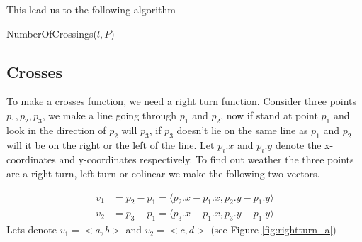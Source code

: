 This lead us to the following algorithm
\begin{algorithm} 
	\caption{NumberOfCrossings($l,P$)}
	\begin{algorithmic}[1] 
		\State {}
	\end{algorithmic}
\end{algorithm}

\subsection{Crosses}
To make a crosses function, we need a right turn function. Consider three
points $p_1,p_2,p_3$, we make a line going through $p_1$ and $p_2$, now if
stand at point $p_1$ and look in the direction of $p_2$ will $p_3$, if $p_3$
doesn't lie on the same line as $p_1$ and $p_2$ will it be on the
right or the left of the line. 
Let $p_i.x$ and $p_i.y$ denote the x-coordinates
and y-coordinates respectively.
To find out weather the three points are a right turn, left turn or colinear we
make the following two vectors.

\begin{align*}
	v_1 &=p_2-p_1 = \langle p_2.x-p_1.x,p_2.y-p_1.y\rangle\\
	v_2 &=p_3-p_1 = \langle p_3.x-p_1.x,p_3.y-p_1.y\rangle
\end{align*}
Lets denote $v_1 = <a,b>$ and $v_2 = <c,d>$
(see Figure \ref{fig:rightturn_a})
